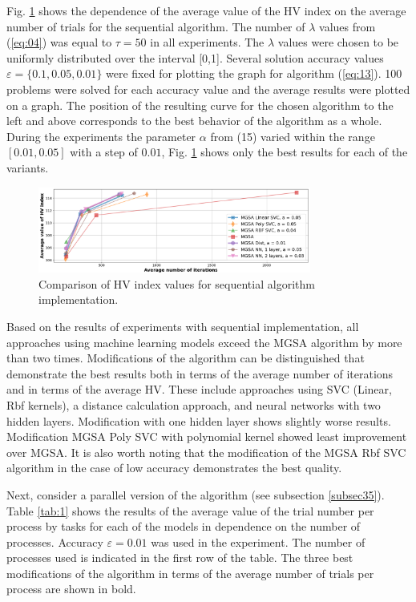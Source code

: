 \documentclass[runningheads]{llncs}
\begin{document}
Fig. \ref{fig5} shows the dependence of the average value of the HV index on the average number of trials for the sequential algorithm. The number of $\lambda$ values from (\ref{eq:04}) was equal to $\tau=50$ in all experiments. The $\lambda$ values were chosen to be uniformly distributed over the interval [0,1]. Several solution accuracy values $\varepsilon = \{0.1,0.05,0.01\}$ were fixed for plotting the graph for algorithm (\ref{eq:13}). 100 problems were solved for each accuracy value and the average results were plotted on a graph. The position of the resulting curve for the chosen algorithm to the left and above corresponds to the best behavior of the algorithm as a whole. During the experiments the parameter $\alpha$ from (15) varied within the range $[0.01,0.05]$ with a step of $0.01$, Fig. \ref{fig5} shows only the best results for each of the variants.



\begin{figure}[t]
\center
\includegraphics[width=0.8\textwidth]{fig5.png}
\caption{Comparison of HV index values for sequential algorithm implementation.} \label{fig5}
\end{figure}

Based on the results of experiments with sequential implementation, all approaches using machine learning models exceed the MGSA algorithm by more than two times. Modifications of the algorithm can be distinguished that demonstrate the best results both in terms of the average number of iterations and in terms of the average HV. These include approaches using SVC (Linear, Rbf kernels), a distance calculation approach, and neural networks with two hidden layers. Modification with one hidden layer shows slightly worse results. Modification  MGSA Poly SVC with polynomial kernel showed least improvement over MGSA. It is also worth noting that the modification of the MGSA Rbf SVC algorithm in the case of low accuracy demonstrates the best quality.

Next, consider a parallel version of the algorithm (see subsection \ref{subsec35}). Table \ref{tab:1} shows the results of the average value of the trial number per process by tasks for each of the models in dependence on the number of processes. Accuracy $\varepsilon=0.01$ was used in the experiment. The number of processes used is indicated in the first row of the table. The three best modifications of the algorithm in terms of the average number of trials per process are shown in bold.
\end{document}
